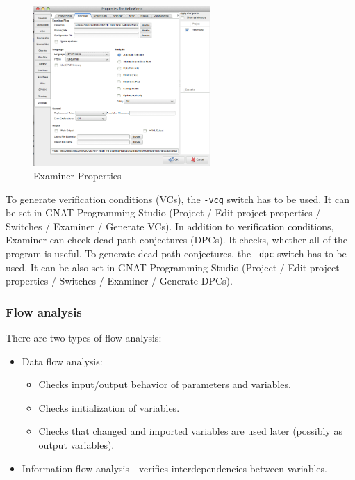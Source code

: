 \begin{figure}[ht]%
    \begin{center}
    	\includegraphics[width=0.6\textwidth]{figures/Properties-Switches-Examiner.png}    	
    \end{center}
    \caption{Examiner Properties}
    \label{figure:examinerproperties}
\end{figure}

To generate verification conditions (VCs), the \lstinline{-vcg} switch has to be used. It can be set in GNAT Programming Studio (Project / Edit project properties / Switches / Examiner / Generate VCs).
In addition to verification conditions, Examiner can check dead path conjectures (DPCs). It checks, whether all of the program is useful. To generate dead path conjectures, the \lstinline{-dpc} switch has to be used. It can be also set in GNAT Programming Studio (Project / Edit project properties / Switches / Examiner / Generate DPCs).


\subsubsection{Flow analysis}
\label{background:sparkverification:examiner:flowanalysis}
There are two types of flow analysis:
\begin{itemize}
	\item Data flow analysis:
	\begin{itemize}
		\item Checks input/output behavior of parameters and variables.
		\item Checks initialization of variables.
		\item Checks that changed and imported variables are used later (possibly as output variables).
	\end{itemize}
	\item Information flow analysis - verifies interdependencies between variables.
\end{itemize}

